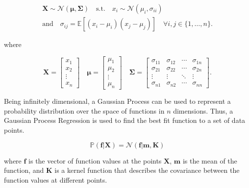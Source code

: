 \documentclass{article}
\newcommand{\Ex}{\mathbb{E}}
\begin{document}
\begin{equation}
\begin{gathered}
    \mathbf{X} \sim \mathcal{N}(\mathbf{\mu}, \mathbf{\Sigma}) \quad \text{s.t.} \quad x_i \sim \mathcal{N}(\mu_i, \sigma_{ii}) \\
    \text{and} \quad  \sigma_{ij} = \Ex[(x_i - \mu_i)(x_j - \mu_j)] \quad \forall i,j \in \{1, \ldots, n\}.
  \end{gathered}
\end{equation}

where

\begin{equation}
\mathbf{X} = \begin{bmatrix}
    x_1    \\
    x_2    \\
    \vdots \\
    x_n
  \end{bmatrix}
  \quad
  \mathbf{\mu} = \begin{bmatrix}
    \mu_1  \\
    \mu_2  \\
    \vdots \\
    \mu_n
  \end{bmatrix}
  \quad
  \mathbf{\Sigma} = \begin{bmatrix}
    \sigma_{11} & \sigma_{12} & \cdots & \sigma_{1n} \\
    \sigma_{21} & \sigma_{22} & \cdots & \sigma_{2n} \\
    \vdots      & \vdots      & \ddots & \vdots      \\
    \sigma_{n1} & \sigma_{n2} & \cdots & \sigma_{nn}
  \end{bmatrix}.
\end{equation}

Being infinitely dimensional, a Gaussian Process can be used to represent a probability distribution over the space of functions in $n$ dimensions. Thus, a Gaussian Process Regression is used to find the best fit function to a set of data points.

\begin{equation}
\mathbb{P}(\mathbf{f} | \mathbf{X}) = \mathcal{N}(\mathbf{f} | \mathbf{m}, \mathbf{K})
\end{equation}

where $\mathbf{f}$ is the vector of function values at the points $\mathbf{X}$, $\mathbf{m}$ is the mean of the function, and $\mathbf{K}$ is a kernel function that describes the covariance between the function values at different points.
\end{document}
